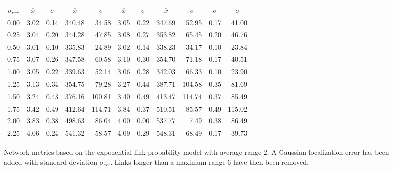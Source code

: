 \documentclass{article}
\begin{document}
\begin{figure}[h]
\begin{center}
\begin{tabular}{|r|rr|rr|rr|rr|rr|}
\hline
\multicolumn{1}{|c|}{$\sigma_{err}$} & \multicolumn{1}{|c}{$\overline{x}$} & \multicolumn{1}{c|}{$\sigma$} & \multicolumn{1}{|c}{$\overline{x}$} & \multicolumn{1}{c|}{$\sigma$} & \multicolumn{1}{|c}{$\overline{x}$} & \multicolumn{1}{c|}{$\sigma$} & \multicolumn{1}{|c}{$\overline{x}$} & \multicolumn{1}{c|}{$\sigma$} & \multicolumn{1}{|c}{$\sigma$} & \multicolumn{1}{c|}{$\sigma$}\\
0.00 & 3.02 & 0.14 & 340.48 &  34.58 & 3.05 & 0.22 & 347.69 &  52.95 & 0.17 & 41.00\\
0.25 & 3.04 & 0.20 & 344.28 &  47.85 & 3.08 & 0.27 & 353.82 &  65.45 & 0.20 & 46.76\\
0.50 & 3.01 & 0.10 & 335.83 &  24.89 & 3.02 & 0.14 & 338.23 &  34.17 & 0.10 & 23.84\\
0.75 & 3.07 & 0.26 & 347.58 &  60.58 & 3.10 & 0.30 & 354.70 &  71.18 & 0.17 & 40.51\\
1.00 & 3.05 & 0.22 & 339.63 &  52.14 & 3.06 & 0.28 & 342.03 &  66.33 & 0.10 & 23.90\\
1.25 & 3.13 & 0.34 & 354.75 &  79.28 & 3.27 & 0.44 & 387.71 & 104.58 & 0.35 & 81.69\\
1.50 & 3.24 & 0.43 & 376.16 & 100.81 & 3.40 & 0.49 & 413.47 & 114.74 & 0.37 & 85.49\\
1.75 & 3.42 & 0.49 & 412.64 & 114.71 & 3.84 & 0.37 & 510.51 &  85.57 & 0.49 & 115.02\\
2.00 & 3.83 & 0.38 & 498.63 &  86.04 & 4.00 & 0.00 & 537.77 &   7.49 & 0.38 & 86.49\\
2.25 & 4.06 & 0.24 & 541.32 &  58.57 & 4.09 & 0.29 & 548.31 &  68.49 & 0.17 & 39.73\\
\hline
\end{tabular}
\caption{Network metrics based on the exponential link probability model with average range $2$. A Gaussian localization error has been added with standard deviation $\sigma_{err}$. Links longer than a maximum range $6$ have then been removed.}
\label{exp_exp_r_e}
\end{center}
\end{figure}
\end{document}
